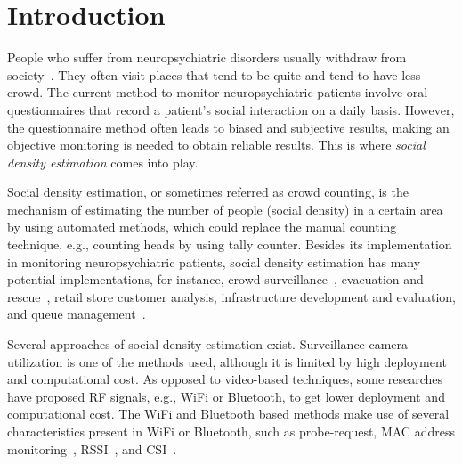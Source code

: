 \chapter{Introduction}\label{ch:introduction}

People who suffer from neuropsychiatric disorders usually withdraw from society~\cite{thesis084,thesis083}. They often visit places that tend to be quite and tend to have less crowd. The current method to monitor neuropsychiatric patients involve oral questionnaires that record a patient's social interaction on a daily basis. However, the questionnaire method often leads to biased and subjective results, making an objective monitoring is needed to obtain reliable results.
This is where \textit{social density estimation} comes into play.

Social density estimation, or sometimes referred as crowd counting, is the mechanism of estimating the number of people (social density) in a certain area by using automated methods, which could replace the manual counting technique, e.g., counting heads by using tally counter. Besides its implementation in monitoring neuropsychiatric patients, social density estimation has many potential implementations, for instance, crowd surveillance~\cite{thesis050}, evacuation and rescue~\cite{thesis045}, retail store customer analysis, infrastructure development and evaluation, and queue management~\cite{thesis012}.

Several approaches of social density estimation exist. Surveillance camera utilization is one of the methods used, although it is limited by high deployment and computational cost. As opposed to video-based techniques, some researches have proposed \ac{RF} signals, e.g., WiFi or Bluetooth, to get lower deployment and computational cost. The WiFi and Bluetooth based methods make use of several characteristics present in WiFi or Bluetooth, such as probe-request, \ac{MAC} address monitoring~\cite{thesis008}, \ac{RSSI}~\cite{thesis046}, and \ac{CSI}~\cite{thesis051}. 

